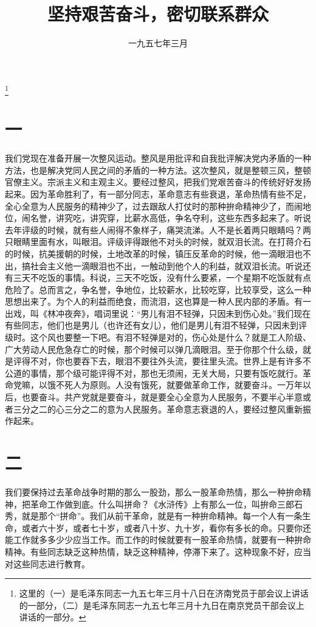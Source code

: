 
\title{坚持艰苦奋斗，密切联系群众}
\date{一九五七年三月}
\thanks{这里的（一）是毛泽东同志一九五七年三月十八日在济南党员于部会议上讲话的一部分，（二）是毛泽东同志一九五七年三月十九日在南京党员干部会议上讲话的一部分。}
\maketitle


\section*{一}

我们党现在准备开展一次整风运动。整风是用批评和自我批评解决党内矛盾的一种方法，也是解决党同人民之间的矛盾的一种方法。这次整风，就是整顿三风，整顿官僚主义。宗派主义和主观主义。要经过整风，把我们党艰苦奋斗的传统好好发扬起来。因为革命胜利了，有一部分同志，革命意志有些衰退，革命热情有些不足，全心全意为人民服务的精神少了，过去跟敌人打仗时的那种拚命精神少了，而闹地位，闹名誉，讲究吃，讲究穿，比薪水高低，争名夺利，这些东西多起来了。听说去年评级的时候，就有些人闹得不象样子，痛哭流涕。人不是长着两只眼睛吗？两只眼睛里面有水，叫眼泪。评级评得跟他不对头的时候，就双泪长流。在打蒋介石的时候，抗美援朝的时候，土地改革的时候，镇压反革命的时候，他一滴眼泪也不出，搞社会主义他一滴眼泪也不出，一触动到他个人的利益，就双泪长流。听说还有三天不吃饭的事情。科说，三天不吃饭，没有什么要紧，一个星期不吃饭就有点危险了。总而言之，争名誉，争地位，比较薪水，比较吃穿，比较享受，这么一种思想出来了。为个人的利益而绝食，而流泪，这也算是一种人民内部的矛盾。有一出戏，叫《林冲夜奔》，唱词里说：“男儿有泪不轻弹，只因未到伤心处。”我们现在有些同志，他们也是男儿（也许还有女儿），他们是男儿有泪不轻弹，只因未到评级时。这个风也要整一下吧。有泪不轻弹是对的，伤心处是什么？就是工人阶级、广大劳动人民危急存亡的时候，那个时候可以弹几滴眼泪。至于你那个什么级，就是评得不对，你也要吞下去，眼泪不要往外头流，要往里头流。世界上是有许多不公道的事情，那个级可能评得不对，那也无须闹，无关大局，只要有饭吃就行。革命党嘛，以饿不死人为原则。人没有饿死，就要做革命工作，就要奋斗。一万年以后，也要奋斗。共产党就是要奋斗，就是要全心全意为人民服务，不要半心半意或者三分之二的心三分之二的意为人民服务。革命意志衰退的人，要经过整风重新振作起来。

\section*{二}

我们要保持过去革命战争时期的那么一股劲，那么一股革命热情，那么一种拚命精神，把革命工作做到底。什么叫拼命？《水浒传》上有那么一位，叫拚命三郎石秀，就是那个“拼命”。我们从前干革命，就是有一种拚命精神。每一个人有一条生命，或者六十岁，或者七十岁，或者八十岁、九十岁，看你有多长的命。只要你还能工作就多多少少应当工作。而工作的时候就要有一股革命热情，就要有一种拚命精神。有些同志缺乏这种热情，缺乏这种精神，停滞下来了。这种现象不好，应当对这些同志进行教育。

